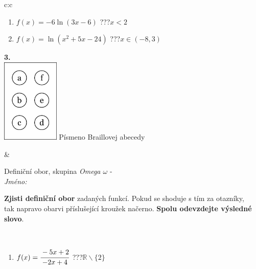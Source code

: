 \documentclass[10pt]{report}
\begin{document}
\begin{tabular}{c:c}
\begin{minipage}[c][104.5mm][t]{0.5\linewidth}
\begin{center}
\begin{minipage}{0.79\linewidth}
\begin{center}
\begin{varwidth}{\linewidth}
\begin{enumerate}
\item $f(x)=-6\ln{(3x-6)}$\quad \dotfill\; ???\;\dotfill \quad $x<2$
\item $f(x)=\ln{(x^2+5x-24)}$\quad \dotfill\; ???\;\dotfill \quad $x\in(-8 , 3)$
\end{enumerate}
\end{varwidth}
\end{center}
\end{minipage}
\begin{minipage}{0.20\linewidth}
\begin{center}
{\Huge\bfseries 3.} \\[2mm]
\includegraphics[height=40mm]{../images/braille.png}
{\small Písmeno Braillovej abecedy}
\end{center}
\end{minipage}
\end{center}
\end{minipage}
&
\begin{minipage}[c][104.5mm][t]{0.5\linewidth}
\begin{center}
\vspace{7mm}
{\huge Definiční obor, skupina \textit{Omega $\omega$} -}\\[5mm]
\textit{Jméno:}\phantom{xxxxxxxxxxxxxxxxxxxxxxxxxxxxxxxxxxxxxxxxxxxxxxxxxxxxxxxxxxxxxxxxx}\\[5mm]
\begin{minipage}{0.95\linewidth}
\begin{center}
\textbf{Zjisti definiční obor} zadaných funkcí. Pokud se shoduje s tím za otazníky,\\tak napravo obarvi příslušející kroužek načerno. \textbf{Spolu odevzdejte výsledné slovo}.
\end{center}
\end{minipage}
\\[1mm]
\begin{minipage}{0.79\linewidth}
\begin{center}
\begin{varwidth}{\linewidth}
\begin{enumerate}
\normalsizerrr
\item $f(x)=\cfrac{-5x+2}{-2x+4}$\quad \dotfill\; ???\;\dotfill \quad $\mathbb{R}\smallsetminus\{2\}$

\end{enumerate}
\end{varwidth}
\end{center}
\end{minipage}
\end{center}
\end{minipage}
\end{tabular}
\end{document}
